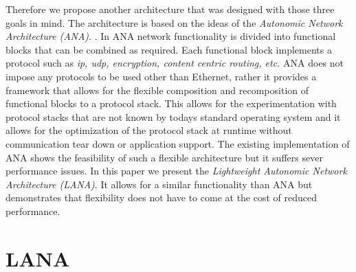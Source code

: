 \documentclass{sig-alternate}
\newcommand{\wolfgang}[1]{\textcolor{blue}{\emph{WM: #1}}}
\begin{document}
Therefore we propose another architecture that was designed with those three goals in mind.
The architecture is based on the ideas of the \textit{Autonomic Network Architecture (ANA)}. \cite{ANAJournal}. In ANA network functionality is divided into functional blocks that can be combined as required. Each functional block implements a protocol such as \textit{ip, udp, encryption, content centric routing, etc.} ANA does not impose any protocols to be used other than Ethernet, rather it provides a framework that allows for the flexible composition and recomposition of functional blocks to a protocol stack. This allows for the experimentation with protocol stacks that are not known by todays standard operating system and it allows for the optimization of the protocol stack at runtime without communication tear down or application support.
The existing implementation of ANA shows the feasibility of such a flexible architecture but it suffers sever performance issues. 
In this paper we present the \textit{Lightweight Autonomic Network Architecture (LANA)}. It allows for a similar functionality than ANA but demonstrates that flexibility does not have to come at the cost of reduced performance.



\section{LANA}



\end{document}
